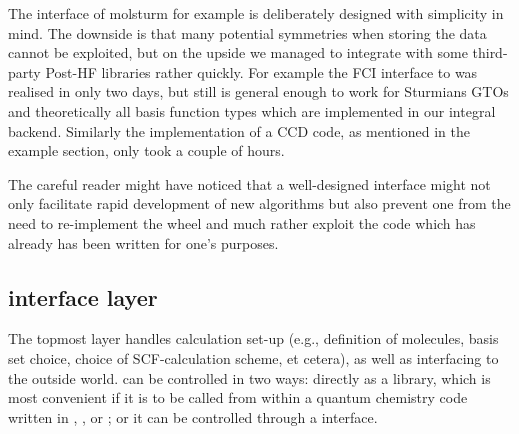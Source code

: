 %
%
The \python interface of molsturm for example is deliberately designed
with simplicity in mind.
The downside is that many potential symmetries when storing the data
cannot be exploited,
but on the upside we managed to integrate \molsturm
with some third-party Post-HF libraries rather quickly.
For example the FCI interface to \pyscf was realised in only two days,
but still is general enough to work for Sturmians GTOs and theoretically
all basis function types which are implemented in our integral backend.
Similarly the implementation of a CCD code, as mentioned in the example section,
only took a couple of hours.

The careful reader might have noticed that a well-designed interface
might not only facilitate rapid development of new algorithms
but also prevent one from the need to re-implement the wheel
and much rather exploit the code which has already has been written
for one's purposes.

%
%
%

%
%
\subsection{\molsturm interface layer}


The topmost \molsturm layer handles calculation set-up 
(e.g., definition of molecules, basis set choice, choice 
of SCF-calculation scheme, et cetera), as well as interfacing 
to the outside world. \molsturm can be controlled in two ways: 
directly as a \cpp library, which is most convenient if it is to 
be called from within a quantum chemistry code written in \cee, \cpp, 
or \fortran; or it can be controlled through a \python interface.


